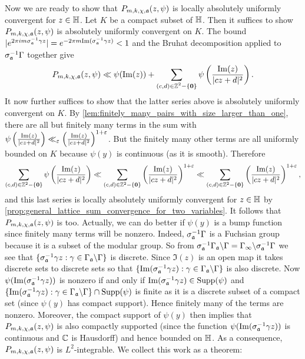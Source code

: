     Now we are ready to show that $P_{m,k,\chi,\mathfrak{a}}(z,\psi)$ is locally absolutely uniformly convergent for $z \in \mathbb{H}$. Let $K$ be a compact subset of $\mathbb{H}$. Then it suffices to show $P_{m,k,\chi,\mathfrak{a}}(z,\psi)$ is absolutely uniformly convergent on $K$. The bound $|e^{2\pi im\sigma_{\mathfrak{a}}^{-1}\gamma z}| = e^{-2\pi m\mathrm{Im}(\sigma_{\mathfrak{a}}^{-1}\gamma z)} < 1$ and the Bruhat decomposition applied to $\sigma_{\mathfrak{a}}^{-1}\Gamma$ together give
    \[
      P_{m,k,\chi,\mathfrak{a}}(z,\psi) \ll \psi(\mathrm{Im}(z))+\sum_{\substack{(c,d) \in \mathbb{Z}^{2}-\{\mathbf{0}\}}}\psi\left(\frac{\mathrm{Im}(z)}{|cz+d|^{2}}\right).
    \]
    It now further suffices to show that the latter series above is absolutely uniformly convergent on $K$. By \cref{lem:finitely_many_pairs_with_size_larger_than_one}, there are all but finitely many terms in the sum with $\psi\left(\frac{\mathrm{Im}(z)}{|cz+d|^{2}}\right) \ll_{\varepsilon} \left(\frac{\mathrm{Im}(z)}{|cz+d|^{2}}\right)^{1+\varepsilon}$. But the finitely many other terms are all uniformly bounded on $K$ because $\psi(y)$ is continuous (as it is smooth). Therefore
    \[
      \sum_{(c,d) \in \mathbb{Z}^{2}-\{\mathbf{0}\}}\psi\left(\frac{\mathrm{Im}(z)}{|cz+d|^{2}}\right) \ll \sum_{(c,d) \in \mathbb{Z}^{2}-\{\mathbf{0}\}}\left(\frac{\mathrm{Im}(z)}{|cz+d|^{2}}\right)^{1+\varepsilon} \ll \sum_{(c,d) \in \mathbb{Z}^{2}-\{\mathbf{0}\}}\left(\frac{\mathrm{Im}(z)}{|cz+d|^{2}}\right)^{1+\varepsilon},
    \]
    and this last series is locally absolutely uniformly convergent for $z \in \mathbb{H}$ by \cref{prop:general_lattice_sum_convergence_for_two_variables}. It follows that $P_{m,k,\chi,\mathfrak{a}}(z,\psi)$ is too. Actually, we can do better if $\psi(y)$ is a bump function since finitely many terms will be nonzero. Indeed, $\sigma_{\mathfrak{a}}^{-1}\Gamma$ is a Fuchsian group because it is a subset of the modular group. So from $\sigma_{\mathfrak{a}}^{-1}\Gamma_{\mathfrak{a}}\backslash\Gamma = \Gamma_{\infty}\backslash\sigma_{\mathfrak{a}}^{-1}\Gamma$ we see that $\{\sigma_{\mathfrak{a}}^{-1}\gamma z:\gamma \in \Gamma_{\mathfrak{a}}\backslash\Gamma\}$ is discrete. Since $\Im(z)$ is an open map it takes discrete sets to discrete sets so that $\{\mathrm{Im}(\sigma_{\mathfrak{a}}^{-1}\gamma z):\gamma \in \Gamma_{\mathfrak{a}}\backslash\Gamma\}$ is also discrete. Now $\psi(\mathrm{Im}(\sigma_{\mathfrak{a}}^{-1}\gamma z))$ is nonzero if and only if $\mathrm{Im}(\sigma_{\mathfrak{a}}^{-1}\gamma z) \in \mathrm{Supp}(\psi)$ and $\{\mathrm{Im}(\sigma_{\mathfrak{a}}^{-1}\gamma z):\gamma \in \Gamma_{\mathfrak{a}}\backslash\Gamma\} \cap \mathrm{Supp}(\psi)$ is finite as it is a discrete subset of a compact set (since $\psi(y)$ has compact support). Hence finitely many of the terms are nonzero. Moreover, the compact support of $\psi(y)$ then implies that $P_{m,k,\chi,\mathfrak{a}}(z,\psi)$ is also compactly supported (since the function $\psi(\mathrm{Im}(\sigma_{\mathfrak{a}}^{-1}\gamma z))$ is continuous and $\mathbb{C}$ is Hausdorff) and hence bounded on $\mathbb{H}$. As a consequence, $P_{m,k,\chi,\mathfrak{a}}(z,\psi)$ is $L^{2}$-integrable. We collect this work as a theorem:

